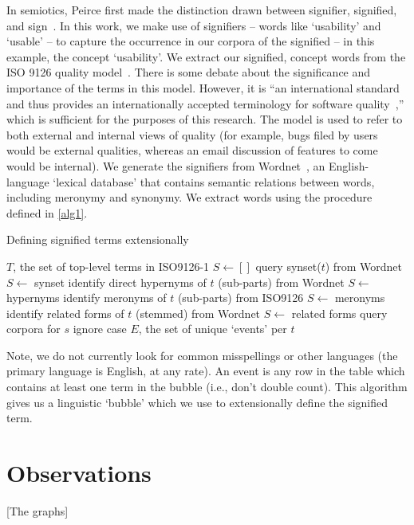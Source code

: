 \documentclass[conference, compsoc]{IEEEtran}
\begin{document}
In semiotics, Peirce first made the distinction drawn between signifier, signified, and sign~\cite{atkin2006}. In this work, we make use of signifiers -- words like `usability' and `usable' -- to capture the occurrence in our corpora of the signified -- in this example, the concept `usability'. We extract our signified, concept words from the ISO 9126 quality model~\cite{iso9126}. There is some debate about the significance and importance of the terms in this model. However, it is ``an international standard and thus provides an internationally accepted terminology for software quality~\cite[p. 58]{Boegh2008},'' which is sufficient for the purposes of this research. The model is used to refer to both external and internal views of quality (for example, bugs filed by users would be external qualities, whereas an email discussion of features to come would be internal). We generate the signifiers from Wordnet~\cite{Fellbaum1998}, an English-language `lexical database' that contains semantic relations between words, including meronymy and synonymy. We extract words using the procedure defined in \ref{alg1}.
\renewcommand{\algorithmiccomment}[1]{// #1}
\begin{algorithm}[H]
\caption{Defining signified terms extensionally}
  \label{alg1}
\begin{algorithmic}
	\REQUIRE $T$, the set of top-level terms in ISO9126-1
	\STATE $S \leftarrow []$
	\STATE query synset($t$) from Wordnet
	\STATE $S \leftarrow $ synset
	\STATE identify direct hypernyms of $t$ (sub-parts) from Wordnet
	\STATE $S \leftarrow$ hypernyms %
	\STATE identify meronyms of $t$ (sub-parts) from ISO9126
	\STATE $S \leftarrow$ meronyms %
	\STATE identify related forms of $t$ (stemmed) from Wordnet
	\STATE $S \leftarrow$ related forms
		\STATE query corpora for $s$
		\COMMENT ignore case
	\ENDFOR
  \ENDFOR
\RETURN $E$, the set of unique `events' per $t$

\end{algorithmic}
\end{algorithm}
Note, we do not currently look for common misspellings or other languages (the primary language is English, at any rate). An event is any row in the table which contains at least one term in the bubble (i.e., don't double count). This algorithm gives us a linguistic `bubble' which we use to extensionally define the signified term.

\section{Observations}
[The graphs]
\end{document}

